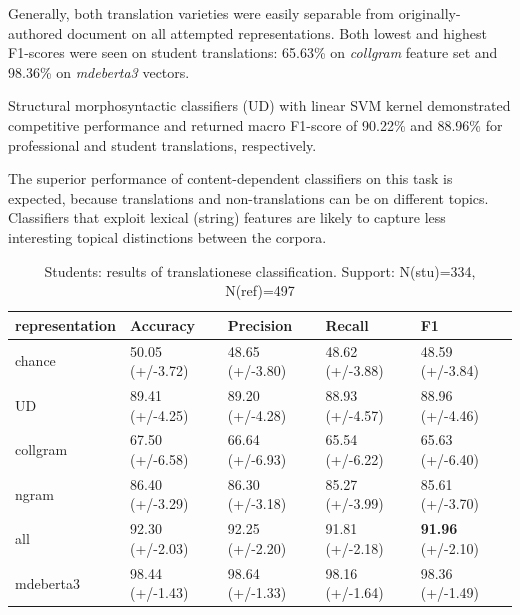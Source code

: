 Generally, both translation varieties were easily separable from originally-authored document on all attempted representations. Both lowest and highest F1-scores were seen on student translations: 65.63\% on \textit{collgram} feature set and 98.36\% on \textit{mdeberta3} vectors. 

Structural morphosyntactic classifiers (UD) with linear SVM kernel demonstrated competitive performance and returned macro F1-score of 90.22\% and 88.96\% for professional and student translations, respectively.

The superior performance of content-dependent classifiers on this task is expected, because translations and non-translations can be on different topics. Classifiers that exploit lexical (string) features are likely to capture less interesting topical distinctions between the corpora.

\begin{table}[H]
	\begin{tabular}{l|llll}
		\toprule
		representation    & Accuracy        & Precision       & Recall          & F1              \\
		\midrule
		chance          & 50.05 (+/-3.72) & 48.65 (+/-3.80) & 48.62 (+/-3.88) & 48.59 (+/-3.84) \\
		\hline
		UD              & 89.41 (+/-4.25) & 89.20 (+/-4.28) & 88.93 (+/-4.57) & 88.96 (+/-4.46) \\
		collgram        & 67.50 (+/-6.58) & 66.64 (+/-6.93) & 65.54 (+/-6.22) & 65.63 (+/-6.40) \\
		ngram           & 86.40 (+/-3.29) & 86.30 (+/-3.18) & 85.27 (+/-3.99) & 85.61 (+/-3.70) \\
		all             & 92.30 (+/-2.03) & 92.25 (+/-2.20) & 91.81 (+/-2.18) & \textbf{91.96} (+/-2.10) \\
		\midrule
		mdeberta3  & 98.44 (+/-1.43) & 98.64 (+/-1.33) & 98.16 (+/-1.64) & \boxit{0.4in} 98.36 (+/-1.49)\\
		\bottomrule
	\end{tabular}
	\caption{\label{tab:stu-ref}Students: results of translationese classification. Support: N(stu)=334, N(ref)=497}
\end{table}

